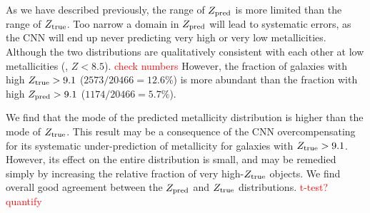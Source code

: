 \documentclass[fleqn,usenatbib]{mnras}
\newcommand{\editorial}[1]{\textcolor{red}{#1}}
\begin{document}
As we have described previously, the range of $Z_{\rm pred}$ is more limited than the range of $Z_{\rm true}$. Too narrow a domain in $Z_{\rm pred}$ will lead to systematic errors, as the CNN will end up never predicting very high or very low metallicities. Although the two distributions are qualitatively consistent with each other at low metallicities (\eg, $Z < 8.5$). \editorial{check numbers} However, the fraction of galaxies with high $Z_{\rm true} > 9.1$ ($2573/20466 = 12.6\%$) is more abundant than the fraction with high $Z_{\rm pred} > 9.1$ ($1174/20466 = 5.7\%$).

We find that the mode of the predicted metallicity distribution is higher than the mode of $Z_{\rm true}$. This result may be a consequence of the CNN overcompensating for its systematic under-prediction of metallicity for galaxies with $Z_{\rm true} > 9.1$. However, its effect on the entire distribution is small, and may be remedied simply by increasing the relative fraction of very high-$Z_{\rm true}$ objects. We find overall good agreement between the $Z_{\rm pred}$ and $Z_{\rm true}$ distributions. \editorial{t-test? quantify}
\end{document}
